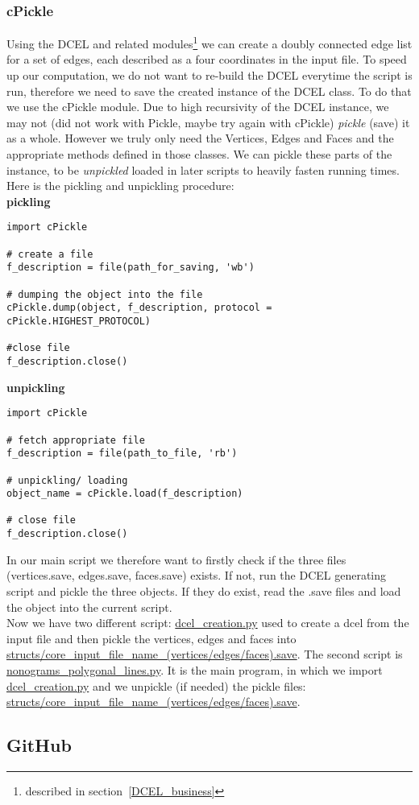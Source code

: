 \documentclass{article}
\begin{document}
\subsubsection{cPickle}
Using the DCEL and related modules\footnote{described in section~\ref{DCEL_business}} we can create a doubly connected edge list for a set of edges, each described as a four coordinates in the input file. To speed up our computation, we do not want to re-build the DCEL everytime the script is run, therefore we need to save the created instance of the DCEL class. To do that we use the cPickle module. Due to high recursivity of the DCEL instance, we may not (did not work with Pickle, maybe try again with cPickle) \emph{pickle} (save) it as a whole. However we truly only need the Vertices, Edges and Faces and the appropriate methods defined in those classes. We can pickle these parts of the instance, to be \emph{unpickled} loaded in later scripts to heavily fasten running times. Here is the pickling and unpickling procedure:\\ 


{\bf pickling}
\begin{verbatim}
import cPickle

# create a file
f_description = file(path_for_saving, 'wb')

# dumping the object into the file
cPickle.dump(object, f_description, protocol = cPickle.HIGHEST_PROTOCOL)

#close file
f_description.close()
\end{verbatim}


{\bf unpickling}
\begin{verbatim}
import cPickle

# fetch appropriate file
f_description = file(path_to_file, 'rb')

# unpickling/ loading
object_name = cPickle.load(f_description)

# close file
f_description.close()
\end{verbatim}


In our main script we therefore want to firstly check if the three files (vertices.save, edges.save, faces.save) exists. If not, run the DCEL generating script and pickle the three objects. If they do exist, read the .save files and load the object into the current script.\\

Now we have two different script: \url{dcel_creation.py} used to create a dcel from the input file and then pickle the vertices, edges and faces into \url{structs/core_input_file_name_(vertices/edges/faces).save}. The second script is \url{nonograms_polygonal_lines.py}. It is the main program, in which we import \url{dcel_creation.py} and we unpickle (if needed) the pickle files: \url{structs/core_input_file_name_(vertices/edges/faces).save}.

\subsection{GitHub}
\end{document}
